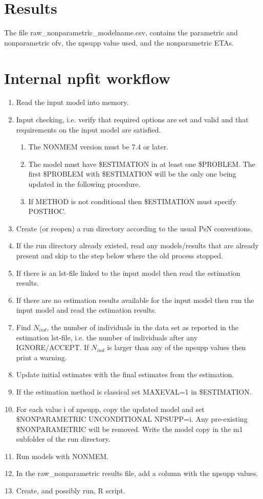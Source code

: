 \section{Results}

The file raw\_nonparametric\_modelname.csv, contains the parametric and nonparametric ofv, the npsupp value used, and the nonparametric ETAs.

\section{Internal npfit workflow}

\begin{enumerate}
\item Read the input model into memory.
\item Input checking, i.e. verify that required options are set and valid and that requirements on the input model
are satisfied.
\begin{enumerate}
\item The NONMEM version must be 7.4 or later.
\item The model must have \$ESTIMATION in at least one \$PROBLEM. The first \$PROBLEM with \$ESTIMATION will be the
only one being updated in the following procedure.
\item If METHOD is not conditional then \$ESTIMATION must specify POSTHOC.
\end{enumerate}
\item Create (or reopen) a run directory according to the usual PsN conventions.
\item If the run directory already existed, read any models/results that are already present and skip
to the step below where the old process stopped.
\item If there is an lst-file linked to the input model then read the estimation results.
\item If there are no estimation results available for the input model then run the input model and read the estimation results.
\item Find $N_{ind}$, the number of individuals in the data set as reported in the estimation lst-file,
i.e. the number of individuals after any IGNORE/ACCEPT. If $N_{ind}$ is larger than any of the npsupp values
then print a warning.
\item Update initial estimates with the final estimates from the estimation.
\item If the estimation method is classical set MAXEVAL=1 in \$ESTIMATION. 
\item For each value i of npsupp, copy the updated model and set \$NONPARAMETRIC UNCONDITIONAL NPSUPP=i. Any pre-existing\\ \$NONPARAMETRIC will be removed.
Write the model copy in the m1 subfolder of the run directory.
\item Run models with NONMEM.
\item In the raw\_nonparametric results file, add a column with the npsupp values. 
\item Create, and possibly run, R script.
\end{enumerate}



